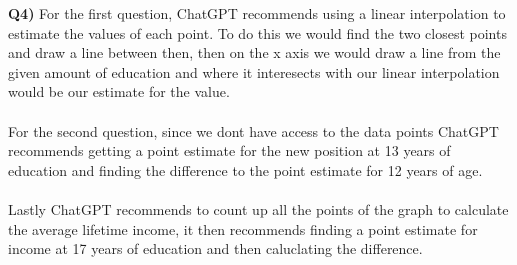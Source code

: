 \documentclass{article}
\begin{document}
\begin{titlepage}
\vspace{0.7cm}

\textbf{Q4)} For the first question, ChatGPT recommends using a linear interpolation to estimate the values of each point. To do this we would find the two closest points and draw a line between then, then on the x axis we would draw a line from the given amount of education and where it interesects with our linear interpolation would be our estimate for the value.\\\\
For the second question, since we dont have access to the data points ChatGPT recommends getting a point estimate for the new position at 13 years of education and finding the difference to the point estimate for 12 years of age. \\\\
Lastly ChatGPT recommends to count up all the points of the graph to calculate the average lifetime income, it then recommends finding a point estimate for income at 17 years of education and then caluclating the difference. 


\end{titlepage}
\end{document}
